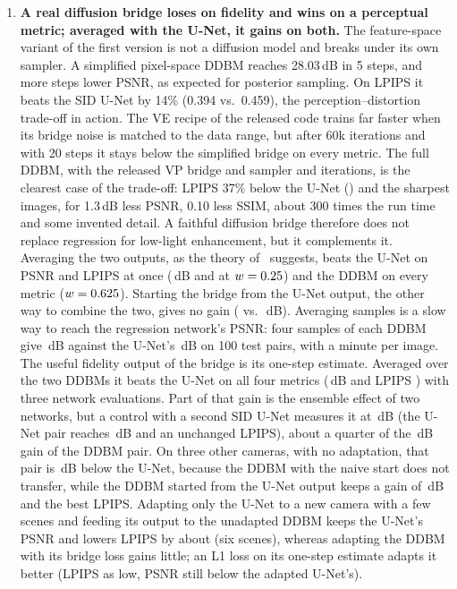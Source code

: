 \begin{enumerate}
\item \textbf{A real diffusion bridge loses on fidelity and wins on a perceptual metric; averaged with the U-Net, it gains on both.} The feature-space variant of the first version is not a diffusion model and breaks under its own sampler. A simplified pixel-space DDBM reaches 28.03\,dB in 5 steps, and more steps lower PSNR, as expected for posterior sampling. On LPIPS it beats the SID U-Net by 14\% (0.394 vs.\ 0.459), the perception--distortion trade-off in action. The VE recipe of the released code trains far faster when its bridge noise is matched to the data range, but after 60k iterations and with 20 steps it stays below the simplified bridge on every metric. The full DDBM, with the released VP bridge and sampler and \VPITERS{} iterations, is the clearest case of the trade-off: LPIPS 37\% below the U-Net (\VPFORTYLPIPS{}) and the sharpest images, for 1.3\,dB less PSNR, 0.10 less SSIM, about 300 times the run time and some invented detail. A faithful diffusion bridge therefore does not replace regression for low-light enhancement, but it complements it. Averaging the two outputs, as the theory of~\cite{freirich2021wasserstein} suggests, beats the U-Net on PSNR and LPIPS at once (\BLENDQPSNR\,dB and \BLENDQLPIPS{} at $w=0.25$) and the DDBM on every metric ($w=0.625$). Starting the bridge from the U-Net output, the other way to combine the two, gives no gain (\VPUNETPSNR{} vs.\ \VPFORTYPSNR\,dB). Averaging samples is a slow way to reach the regression network's PSNR: four samples of each DDBM give \MSEIGHTPSNR\,dB against the U-Net's \MSUNETPSNR\,dB on 100 test pairs, with a minute per image. The useful fidelity output of the bridge is its one-step estimate. Averaged over the two DDBMs it beats the U-Net on all four metrics (\STEPAVGPSNR\,dB and LPIPS \STEPAVGLPIPS{}) with three network evaluations. Part of that gain is the ensemble effect of two networks, but a control with a second SID U-Net measures it at \GABA\,dB (the U-Net pair reaches \UABPSNR\,dB and an unchanged LPIPS), about a quarter of the \GDDA\,dB gain of the DDBM pair. On three other cameras, with no adaptation, that pair is \XPAIRAABS\,dB below the U-Net, because the DDBM with the naive start does not transfer, while the DDBM started from the U-Net output keeps a gain of \XUSA\,dB and the best LPIPS. Adapting only the U-Net to a new camera with a few scenes and feeding its output to the unadapted DDBM keeps the U-Net's PSNR and lowers LPIPS by about \FSDULSIX{} (six scenes), whereas adapting the DDBM with its bridge loss gains little; an L1 loss on its one-step estimate adapts it better (LPIPS as low, PSNR still below the adapted U-Net's).
\end{enumerate}

